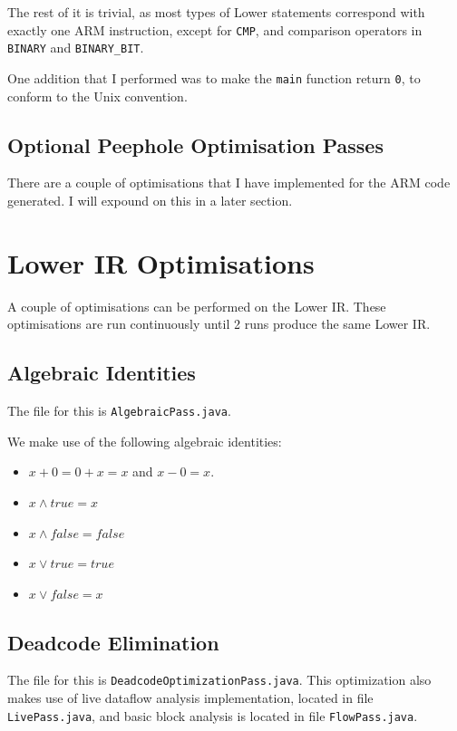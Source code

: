 \documentclass[nonacm, acmsmall, screen, 10pt]{acmart}
\begin{document}
The rest of it is trivial, as most types of Lower statements correspond with exactly one ARM instruction, except for \texttt{CMP}, and comparison operators in \texttt{BINARY} and \texttt{BINARY\_BIT}.

One addition that I performed was to make the \texttt{main} function return \texttt{0}, to conform to the Unix convention.

\subsection{Optional Peephole Optimisation Passes}
There are a couple of optimisations that I have implemented for the ARM code generated.
I will expound on this in a later section.

\section{Lower IR Optimisations}
A couple of optimisations can be performed on the Lower IR.
These optimisations are run continuously until 2 runs produce the same Lower IR.

\subsection{Algebraic Identities}
The file for this is \texttt{AlgebraicPass.java}.

We make use of the following algebraic identities:
\begin{itemize}
  \item $x + 0 = 0 + x = x$ and $x - 0 = x$.
  \item $x \land true = x$
  \item $x \land false = false$
  \item $x \lor true = true$
  \item $x \lor false = x$
\end{itemize}

\subsection{Deadcode Elimination}
The file for this is \texttt{DeadcodeOptimizationPass.java}.
This optimization also makes use of live dataflow analysis implementation, located in file \texttt{LivePass.java}, and basic block analysis is located in file \texttt{FlowPass.java}.
\end{document}
